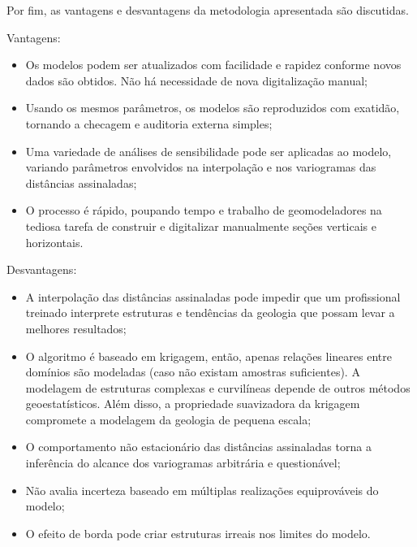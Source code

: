 Por fim, as vantagens e desvantagens da metodologia apresentada são discutidas.

Vantagens:

\begin{itemize}
\item Os modelos podem ser atualizados com facilidade e rapidez conforme novos dados são obtidos. Não há necessidade de nova digitalização manual;
\item Usando os mesmos parâmetros, os modelos são reproduzidos com exatidão, tornando a checagem e auditoria externa simples;
\item Uma variedade de análises de sensibilidade pode ser aplicadas ao modelo, variando parâmetros envolvidos na interpolação e nos variogramas das distâncias assinaladas;
\item O processo é rápido, poupando tempo e trabalho de geomodeladores na tediosa tarefa de construir e digitalizar manualmente seções verticais e horizontais.
\end{itemize}

Desvantagens:

\begin{itemize}
\item A interpolação das distâncias assinaladas pode impedir que um profissional treinado interprete estruturas e tendências da geologia que possam levar a melhores resultados;
\item O algoritmo é baseado em krigagem, então, apenas relações lineares entre domínios são modeladas (caso não existam amostras suficientes). A modelagem de estruturas complexas e curvilíneas depende de outros métodos geoestatísticos. Além disso, a propriedade suavizadora da krigagem compromete a modelagem da geologia de pequena escala;
\item O comportamento não estacionário das distâncias assinaladas torna a inferência do alcance dos variogramas arbitrária e questionável;
\item Não avalia incerteza baseado em múltiplas realizações equiprováveis do modelo;
\item O efeito de borda pode criar estruturas irreais nos limites do modelo.
\end{itemize}
